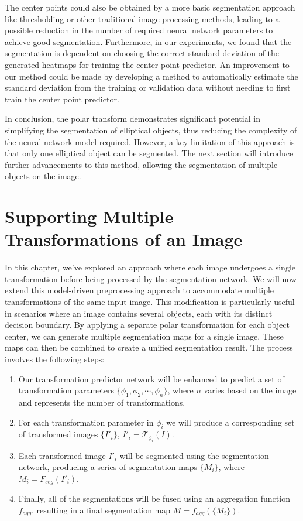 The center points could also be obtained by a more basic segmentation approach 
like thresholding or other traditional image processing methods, leading to a possible reduction in the 
number of required neural network parameters to achieve good segmentation. Furthermore, in our experiments,
we found that the segmentation is dependent on choosing the correct standard deviation of the generated 
heatmaps for training the center point predictor. An improvement to our method could be made by developing
a method to automatically estimate the standard deviation from the training or validation data without needing
to first train the center point predictor.

In conclusion, the polar transform demonstrates significant potential in simplifying the segmentation of elliptical objects, thus reducing the complexity of the neural network model required. However, a key limitation of this approach is that only one elliptical object can be segmented. The next section will introduce further advancements to this method, allowing the segmentation of multiple objects on the image.

\section{Supporting Multiple Transformations of an Image}

In this chapter, we've explored an approach where each image undergoes a single transformation before being processed by the segmentation network. We will now extend this model-driven preprocessing approach to accommodate multiple transformations of the same input image. This modification is particularly useful in scenarios where an image contains several objects, each with its distinct decision boundary. By applying a separate polar transformation for each object center, we can generate multiple segmentation maps for a single image. These maps can then be combined to create a unified segmentation result. The process involves the following steps:

\begin{enumerate}
	\item Our transformation predictor network will be enhanced to predict a set of transformation parameters \(\{\phi_1, \phi_2, \cdots, \phi_n\}\), where \(n\) varies based on the image and represents the number of transformations.
	\item For each transformation parameter in $\phi_i$ we will produce a corresponding set of transformed images $\{I'_i\}$, $I'_i = \mathcal{T}_{\phi_i}(I)$.
	\item Each transformed image $I'_i$ will be segmented using the segmentation network, producing a series of segmentation maps \(\{M_i\}\), where \(M_i = F_{seg}(I'_i)\).
	\item Finally, all of the segmentations will be fused using an aggregation function $f_{agg}$, resulting in a final segmentation map $M = f_{agg}(\{M_i\})$.
\end{enumerate}

